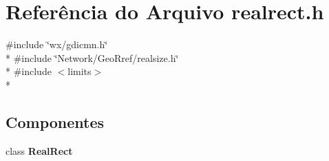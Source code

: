\section{Referência do Arquivo realrect.\+h}
\label{realrect_8h}
{\ttfamily \#include \char`\"{}wx/gdicmn.\+h\char`\"{}}\\*
{\ttfamily \#include \char`\"{}Network/\+Geo\+Rref/realsize.\+h\char`\"{}}\\*
{\ttfamily \#include $<$limits$>$}\\*
\subsection*{Componentes}
\begin{DoxyCompactItemize}
\item 
class {\bf Real\+Rect}
\end{DoxyCompactItemize}

